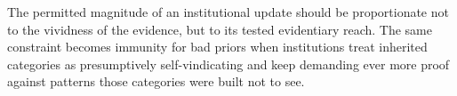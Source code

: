 
The permitted magnitude of an institutional update should be proportionate not to the vividness of the evidence, but to its tested evidentiary reach. The same constraint becomes immunity for bad priors when institutions treat inherited categories as presumptively self-vindicating and keep demanding ever more proof against patterns those categories were built not to see.
